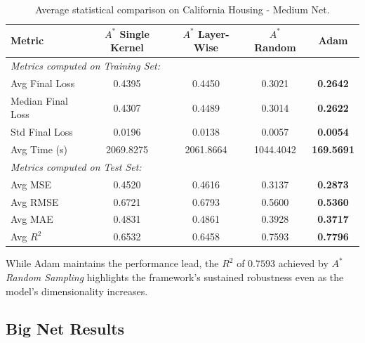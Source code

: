 \begin{table}[htbp]
\centering
\scriptsize
\begin{tabular}{|l|c|c|c|c|}
\hline
\textbf{Metric}   & \textbf{$A^*$ Single Kernel} & \textbf{$A^*$ Layer-Wise} & \textbf{$A^*$ Random} & \textbf{Adam} \\ \hline
\multicolumn{5}{|l|}{\textit{Metrics computed on Training Set:}} \\ \hline
Avg Final Loss          & 0.4395                       & 0.4450                    & 0.3021                & \textbf{0.2642} \\ 
Median Final Loss       & 0.4307                       & 0.4489                    & 0.3014                & \textbf{0.2622} \\
Std Final Loss          & 0.0196                       & 0.0138                    & 0.0057                & \textbf{0.0054} \\ \hline
Avg Time (s)            & 2069.8275                    & 2061.8664                 & 1044.4042             & \textbf{169.5691} \\ \hline
\multicolumn{5}{|l|}{\textit{Metrics computed on Test Set:}} \\ \hline
Avg MSE                 & 0.4520                       & 0.4616                    & 0.3137                & \textbf{0.2873} \\ 
Avg RMSE                & 0.6721                       & 0.6793                    & 0.5600                & \textbf{0.5360} \\ 
Avg MAE                 & 0.4831                       & 0.4861                    & 0.3928                & \textbf{0.3717} \\ 
Avg $R^2$               & 0.6532                       & 0.6458                    & 0.7593                & \textbf{0.7796} \\ \hline
\end{tabular}
\caption{Average statistical comparison on California Housing - Medium Net.}
\label{tab:medium_net_california}
\end{table}

While Adam maintains the performance lead, the $R^2$ of $0.7593$ achieved by \textit{$A^*$ Random Sampling} highlights the framework's sustained robustness even as the model's dimensionality increases.
\newpage

\subsection{Big Net Results}

